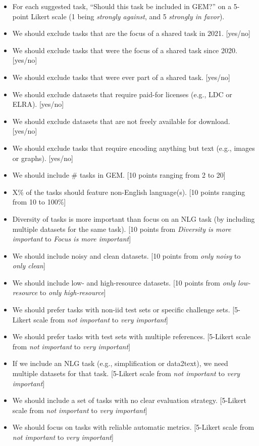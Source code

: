 \documentclass[11pt,a4paper]{article}
\begin{document}
\begin{itemize}[itemsep=0mm]
    \item For each suggested task, ``Should this task be included in GEM?'' on a 5-point Likert scale (1 being \textit{strongly against}, and 5 \textit{strongly in favor}). 
    \item We should exclude tasks that are the focus of a shared task in 2021. [yes/no]
    \item We should exclude tasks that were the focus of a shared task since 2020. [yes/no]
    \item We should exclude tasks that were ever part of a shared task. [yes/no]
    \item We should exclude datasets that require paid-for licenses (e.g., LDC or ELRA). [yes/no]
    \item We should exclude datasets that are not freely available for download. [yes/no]
    \item We should exclude tasks that require encoding anything but text (e.g., images or graphs). [yes/no]
    \item We should include \# tasks in GEM. [10 points ranging from 2 to 20]
    \item X\% of the tasks should feature non-English language(s). [10 points ranging from 10 to 100\%]
    \item Diversity of tasks is more important than focus on an NLG task (by including multiple datasets for the same task). [10 points from \textit{Diversity is more important} to \textit{Focus is more important}]
    \item We should include noisy and clean datasets. [10 points from \textit{only noisy} to \textit{only clean}]
    \item We should include low- and high-resource datasets. [10 points from \textit{only low-resource} to \textit{only high-resource}]
    \item We should prefer tasks with non-iid test sets or specific challenge sets. [5-Likert scale from \textit{not important} to \textit{very important}]
    \item We should prefer tasks with test sets with multiple references. [5-Likert scale from \textit{not important} to \textit{very important}]
    \item If we include an NLG task (e.g., simplification or data2text), we need multiple datasets for that task. [5-Likert scale from \textit{not important} to \textit{very important}]
    \item We should include a set of tasks with no clear evaluation strategy. [5-Likert scale from \textit{not important} to \textit{very important}]
    \item We should focus on tasks with reliable automatic metrics. [5-Likert scale from \textit{not important} to \textit{very important}]
    
\end{itemize}
\end{document}
